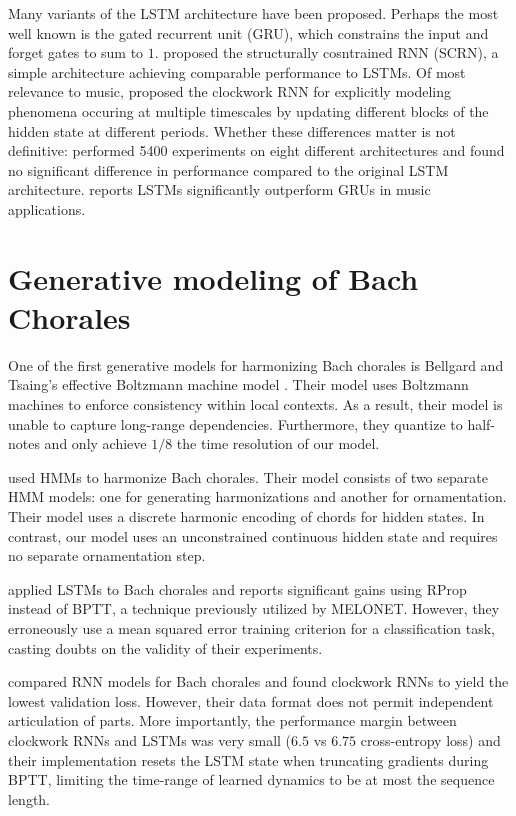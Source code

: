 \documentclass[dissertation.tex]{subfiles}
\begin{document}
Many variants of the LSTM architecture have been proposed. Perhaps the most
well known is the gated recurrent unit (GRU)\cite{cho2014learning}, which
constrains the input and forget gates to sum to $1$. \cite{Mikolov2015}
proposed the structurally cosntrained RNN (SCRN), a simple architecture
achieving comparable performance to LSTMs. Of most relevance to music,
\cite{Koutnik2014} proposed the clockwork RNN for explicitly modeling phenomena
occuring at multiple timescales by updating different blocks of the hidden
state at different periods. Whether these differences matter is not definitive:
\cite{greff2015lstm} performed 5400 experiments on eight different
architectures and found no significant difference in performance compared to
the original LSTM architecture. \cite{Nayebi2015} reports LSTMs significantly
outperform GRUs in music applications.

\section{Generative modeling of Bach Chorales}

One of the first generative models for harmonizing Bach chorales is Bellgard
and Tsaing's effective Boltzmann machine model \cite{bellgard1994harmonizing}. Their model
uses Boltzmann machines to enforce consistency within local contexts. As a result,
their model is unable to capture long-range dependencies. Furthermore, they quantize
to half-notes and only achieve $1/8$ the time resolution of our model.

\cite{Allan2005} used HMMs to harmonize Bach chorales. Their model consists of
two separate HMM models: one for generating harmonizations and another for
ornamentation. Their model uses a discrete harmonic encoding of chords for
hidden states. In contrast, our model uses an unconstrained continuous hidden
state and requires no separate ornamentation step.

\cite{Liu2014} applied LSTMs to Bach chorales and reports significant gains
using RProp instead of BPTT, a technique previously utilized by
MELONET\cite{feulner1994melonet}. However, they erroneously use a mean squared
error training criterion for a classification task, casting doubts on the
validity of their experiments.

\cite{Brien2016} compared RNN models for Bach chorales and found clockwork RNNs to
yield the lowest validation loss. However, their data format does not permit
independent articulation of parts. More importantly, the performance margin between
clockwork RNNs and LSTMs was very small ($6.5$ vs $6.75$ cross-entropy loss) and their
implementation resets the LSTM state when truncating gradients during BPTT, limiting the
time-range of learned dynamics to be at most the sequence length.


\printbibliography
\end{document}
